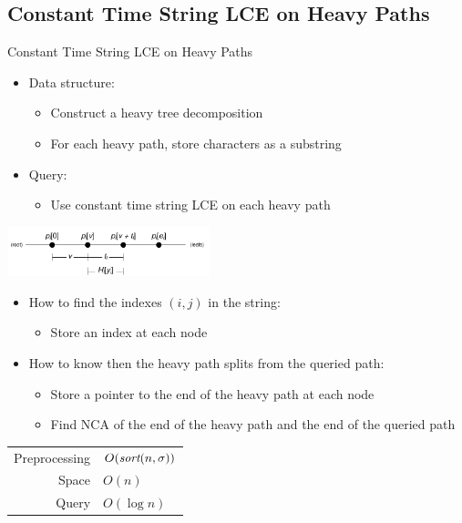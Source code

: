 \documentclass{beamer}
\begin{document}
\subsection{Constant Time String LCE on Heavy Paths}
\begin{frame}{Constant Time String LCE on Heavy Paths}
    \begin{multicols}{2}{
        \begin{itemize}
            \item Data structure:
            \begin{itemize}
                \item Construct a heavy tree decomposition
                \item For each heavy path, store characters as a substring
            \end{itemize}
            \item Query:
            \begin{itemize}
                \item Use constant time string LCE on each heavy path
            \end{itemize}
        \end{itemize}
        \begin{center}
            \includegraphics[width=0.44\textwidth,page=4]{../doc/tree-fingerprint.pdf}
        \end{center}
        \begin{itemize}
            \item How to find the indexes $(i,j)$ in the string:
            \begin{itemize}
                \item Store an index at each node
            \end{itemize}
            \item How to know then the heavy path splits from the queried path:
            \begin{itemize}
                \item Store a pointer to the end of the heavy path at each node
                \item Find NCA of the end of the heavy path and the end of the queried path
            \end{itemize}
        \end{itemize}
        \begin{tabular}{r l}
            Preprocessing & $O(\textit{sort}(n,\sigma))$ \\
            Space & $O(n)$\\
            Query & $O(\log n)$ \\
        \end{tabular}
    }
    \end{multicols}
\end{frame}
\end{document}
